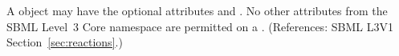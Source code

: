 A \KineticLaw object may have the optional attributes   and
.  No other attributes from the SBML Level~3 Core namespace
are permitted on a \KineticLaw.  (References: SBML L3V1
Section~\ref{sec:reactions}.)
